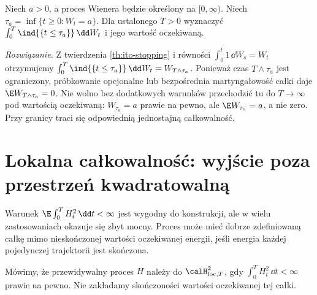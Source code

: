\begin{zadanie}
Niech $a>0$, a proces Wienera będzie określony na
$[0,\infty)$. Niech $\tau_a=\inf\{t\ge0:W_t=a\}$.
Dla ustalonego $T>0$
wyznaczyć $\int_0^T\ind{\{t\le\tau_a\}}\,\dd W_t$
i jego wartość oczekiwaną.

\emph{Rozwiązanie.} Z twierdzenia \ref{th:ito-stopping}
i równości $\int_0^t1\,\dd W_s=W_t$ otrzymujemy
$\int_0^T\ind{\{t\le\tau_a\}}\,\dd W_t=W_{T\wedge\tau_a}$.
Ponieważ czas $T\wedge\tau_a$ jest ograniczony,
próbkowanie opcjonalne lub bezpośrednia martyngałowość
całki daje $\E W_{T\wedge\tau_a}=0$.
Nie wolno bez dodatkowych warunków przechodzić tu do
$T\to\infty$ pod wartością oczekiwaną:
$W_{\tau_a}=a$ prawie na pewno, ale $\E W_{\tau_a}=a$,
a nie zero. Przy granicy traci się odpowiednią
jednostajną całkowalność.
\end{zadanie}

\section{Lokalna całkowalność: wyjście poza przestrzeń kwadratowalną}
Warunek $\E\int_0^T H_t^2\,\dd t<\infty$ jest
wygodny do konstrukcji, ale w wielu zastosowaniach
okazuje się zbyt mocny. Proces może mieć dobrze
zdefiniowaną całkę mimo nieskończonej wartości oczekiwanej
energii, jeśli energia każdej pojedynczej trajektorii
jest skończona.

\begin{definicja}
Mówimy, że przewidywalny proces $H$ należy do
$\calH_{\mathrm{loc},T}^2$, gdy
$\int_0^T H_t^2\,\dd t<\infty$ prawie na pewno.
Nie zakładamy skończoności wartości oczekiwanej tej całki.
\end{definicja}

